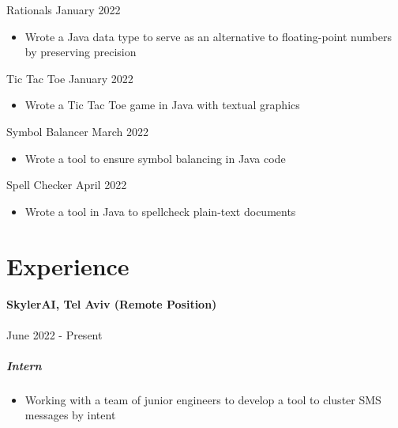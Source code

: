 \documentclass[10pt]{article}
\begin{document}
    Rationals \hfill January 2022
    \begin{itemize}
        \item Wrote a Java data type to serve as an alternative to floating-point numbers by preserving precision
    \end{itemize}

    Tic Tac Toe \hfill January 2022
    \begin{itemize}
        \item Wrote a Tic Tac Toe game in Java with textual graphics
    \end{itemize}

    Symbol Balancer \hfill March 2022
    \begin{itemize}
        \item Wrote a tool to ensure symbol balancing in Java code
    \end{itemize}

    Spell Checker \hfill April 2022
    \begin{itemize}
        \item Wrote a tool in Java to spellcheck plain-text documents
    \end{itemize}


\vfill
\section*{Experience}   

    \paragraph{SkylerAI, Tel Aviv (Remote Position)} \hfill June 2022 - Present
    \subparagraph*{Intern}
    \begin{itemize}
        \item Working with a team of junior engineers to develop a tool to cluster SMS messages by intent
    \end{itemize}
\end{document}
